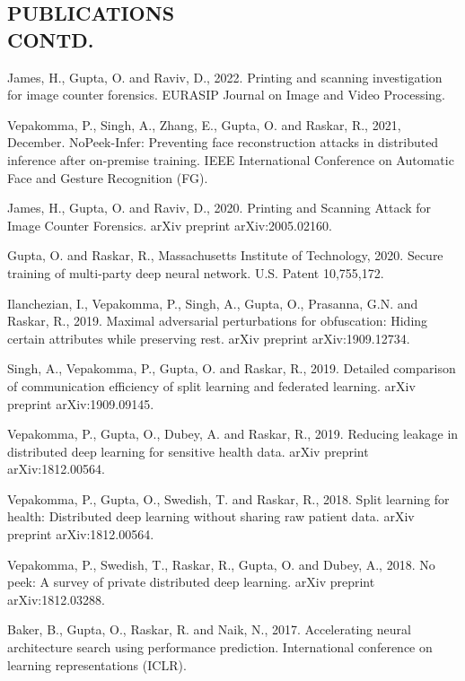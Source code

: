 \documentclass[margin, 10pt]{res} %
\begin{document}
\begin{resume}
\section{PUBLICATIONS \\ CONTD.}
\begin{etaremune}
\item James, H., Gupta, O. and Raviv, D., 2022. Printing and scanning investigation for image counter forensics. EURASIP Journal on Image and Video Processing.
\item Vepakomma, P., Singh, A., Zhang, E., Gupta, O. and Raskar, R., 2021, December. NoPeek-Infer: Preventing face reconstruction attacks in distributed inference after on-premise training. IEEE International Conference on Automatic Face and Gesture Recognition (FG).
\item James, H., Gupta, O. and Raviv, D., 2020. Printing and Scanning Attack for Image Counter Forensics. arXiv preprint arXiv:2005.02160.
\item Gupta, O. and Raskar, R., Massachusetts Institute of Technology, 2020. Secure training of multi-party deep neural network. U.S. Patent 10,755,172.
\item Ilanchezian, I., Vepakomma, P., Singh, A., Gupta, O., Prasanna, G.N. and Raskar, R., 2019. Maximal adversarial perturbations for obfuscation: Hiding certain attributes while preserving rest. arXiv preprint arXiv:1909.12734.
\item Singh, A., Vepakomma, P., Gupta, O. and Raskar, R., 2019. Detailed comparison of communication efficiency of split learning and federated learning. arXiv preprint arXiv:1909.09145.
\item Vepakomma, P., Gupta, O., Dubey, A. and Raskar, R., 2019. Reducing leakage in distributed deep learning for sensitive health data. arXiv preprint arXiv:1812.00564.
\item Vepakomma, P., Gupta, O., Swedish, T. and Raskar, R., 2018. Split learning for health: Distributed deep learning without sharing raw patient data. arXiv preprint arXiv:1812.00564.
\item Vepakomma, P., Swedish, T., Raskar, R., Gupta, O. and Dubey, A., 2018. No peek: A survey of private distributed deep learning. arXiv preprint arXiv:1812.03288.
\item Baker, B., Gupta, O., Raskar, R. and Naik, N., 2017. Accelerating neural architecture search using performance prediction. International conference on learning representations (ICLR).

\end{etaremune}
\end{resume}
\end{document}
